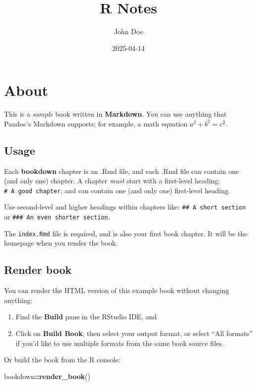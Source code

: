 \documentclass[
  a4paper,
  twoside,
  openright]{book}
\title{R Notes}
\author{John Doe}
\date{2025-04-14}
\newenvironment{Shaded}{\begin{snugshade}}{\end{snugshade}}
\newcommand{\FunctionTok}[1]{\textcolor[rgb]{0.13,0.29,0.53}{\textbf{#1}}}
\newcommand{\NormalTok}[1]{#1}
\newcommand{\SpecialCharTok}[1]{\textcolor[rgb]{0.81,0.36,0.00}{\textbf{#1}}}
\theoremstyle{definition}
\theoremstyle{definition}
\theoremstyle{definition}
\theoremstyle{definition}
\theoremstyle{remark}
\begin{document}
\maketitle

{
\setcounter{tocdepth}{1}
\tableofcontents
}
\chapter{About}\label{about}

This is a \emph{sample} book written in \textbf{Markdown}. You can use anything that Pandoc's Markdown supports; for example, a math equation \(a^2 + b^2 = c^2\).

\section{Usage}\label{usage}

Each \textbf{bookdown} chapter is an .Rmd file, and each .Rmd file can contain one (and only one) chapter. A chapter \emph{must} start with a first-level heading: \texttt{\#\ A\ good\ chapter}, and can contain one (and only one) first-level heading.

Use second-level and higher headings within chapters like: \texttt{\#\#\ A\ short\ section} or \texttt{\#\#\#\ An\ even\ shorter\ section}.

The \texttt{index.Rmd} file is required, and is also your first book chapter. It will be the homepage when you render the book.

\section{Render book}\label{render-book}

You can render the HTML version of this example book without changing anything:

\begin{enumerate}
\def\labelenumi{\arabic{enumi}.}
\item
  Find the \textbf{Build} pane in the RStudio IDE, and
\item
  Click on \textbf{Build Book}, then select your output format, or select ``All formats'' if you'd like to use multiple formats from the same book source files.
\end{enumerate}

Or build the book from the R console:

\begin{Shaded}
\begin{Highlighting}[]
\NormalTok{bookdown}\SpecialCharTok{::}\FunctionTok{render\_book}\NormalTok{()}
\end{Highlighting}
\end{Shaded}
\end{document}
